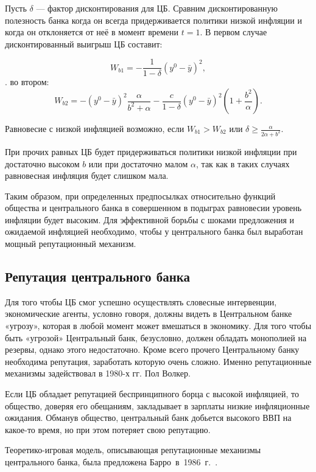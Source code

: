 \documentclass[14pt,a4paper, oneside]{extreport}
\renewcommand{\ge}{\geqslant}
\theoremstyle{plain}              %
\theoremstyle{definition}         %
\begin{document}
Пусть $\delta$ --- фактор дисконтирования для ЦБ. Сравним дисконтированную полезность банка когда он всегда придерживается политики низкой инфляции и когда он  отклоняется от неё в момент времени $t=1$. В первом случае дисконтированный выигрыш ЦБ составит:

\begin{equation}\label{T3-7}
W_{b1} =  -\frac{1}{1-\delta}(y^0-\bar y)^2,
\end{equation}.
во втором:
\begin{equation}\label{T3-8}
W_{b2} =  -(y^0-\bar y)^2 \frac{\alpha}{b^2+\alpha}-\frac{c}{1-\delta}(y^0 - \bar y)^2(1+\frac{b^2}{\alpha}).
\end{equation}

Равновесие с низкой инфляцией возможно, если $W_{b1}>W_{b2}$ или $\delta \ge \frac{\alpha}{2\alpha+b^2}$.

При прочих равных ЦБ будет придерживаться политики низкой инфляции при достаточно высоком $b$ или при достаточно малом $\alpha$, так как в таких случаях равновесная инфляция будет слишком мала.

Таким образом, при определенных предпосылках относительно функций общества и центрального банка в совершенном в подыграх равновесии уровень инфляции будет высоким. Для эффективной борьбы с шоками предложения и ожидаемой инфляцией необходимо, чтобы у центрального банка был выработан мощный репутационный механизм.

\subsection{Репутация центрального банка}

Для того чтобы ЦБ смог успешно осуществлять словесные интервенции, экономические агенты, условно говоря, должны видеть в Центральном банке «угрозу», которая в любой момент может вмешаться в экономику. Для того чтобы быть «угрозой» Центральный банк, безусловно, должен обладать монополией на резервы, однако этого недостаточно. Кроме всего прочего Центральному банку необходима репутация, заработать которую очень сложно. Именно репутационные механизмы задействовал в 1980-х гг. Пол Волкер.

Если ЦБ обладает репутацией беспринципного борца с высокой инфляцией, то общество, доверяя его обещаниям, закладывает в зарплаты низкие инфляционные ожидания. Обманув общество, центральный банк добьется высокого ВВП на какое-то время, но при этом потеряет свою репутацию. 

Теоретико-игровая модель, описывающая репутационные механизмы центрального банка, была предложена Барро~в~1986~г.~\cite{barro1986reputation}.
\end{document}
